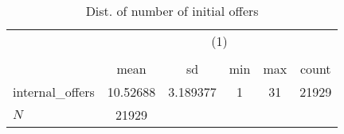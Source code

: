 \begin{table}[htbp]\centering
\def\sym#1{\ifmmode^{#1}\else\(^{#1}\)\fi}
\caption{Dist. of number of initial offers}
\begin{tabular}{l*{1}{ccccc}}
\hline\hline
            &\multicolumn{5}{c}{(1)}                                         \\
            &\multicolumn{5}{c}{}                                            \\
            &        mean&          sd&         min&         max&       count\\
\hline
internal\_offers&    10.52688&    3.189377&           1&          31&       21929\\
\hline
\(N\)       &       21929&            &            &            &            \\
\hline\hline
\end{tabular}
\end{table}
